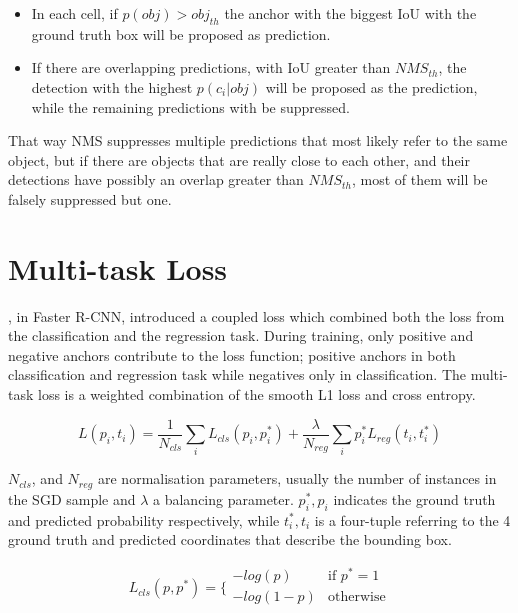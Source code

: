 \begin{itemize}
  \item In each cell, if $p(obj)>obj_{th}$ the anchor with the biggest IoU with the ground truth box will be proposed as prediction. 
  \item If there are overlapping predictions, with IoU greater than $NMS_{th}$, the detection with the highest $p(c_i|obj)$ will be proposed as the prediction, while the remaining predictions with be suppressed. 
\end{itemize}

That way NMS suppresses multiple predictions that most likely refer to the same object, but if there are objects that are really close to each other, and their detections have possibly an overlap greater than $NMS_{th}$, most of them will be falsely suppressed but one. 

\section{Multi-task Loss} 
\cite{ren2015faster}, in Faster R-CNN, introduced a coupled loss which combined both the loss from the classification and the regression task. During training, only positive and negative anchors contribute to the loss function; positive anchors in both classification and regression task while negatives only in classification.
The multi-task loss is a weighted combination of the smooth L1 loss and cross entropy.

\begin{equation}
  L(p_i,t_i) = \frac{1}{N_{cls}}\sum_i{L_{cls}(p_i,p_i^*)}+ \frac{\lambda}{N_{reg}}\sum_i p_i^*{L_{reg}(t_i,t_i^*)}
\end{equation} 

$N_{cls}$, and $N_{reg}$ are normalisation parameters, usually the number of instances in the SGD sample and $\lambda$ a balancing parameter. $p_i^*, p_i$ indicates the ground truth and predicted probability respectively, while $t_i^*, t_i$ is a four-tuple referring to the 4 ground truth and predicted coordinates that describe the bounding box.

\begin{equation}
    L_{cls}(p,p^*)= \bigg\{
    \begin{array}{ll}
      -log(p) & \text{if } p^*=1 \\
      -log(1-p) &  \text{otherwise}\\
    \end{array}
\end{equation}

